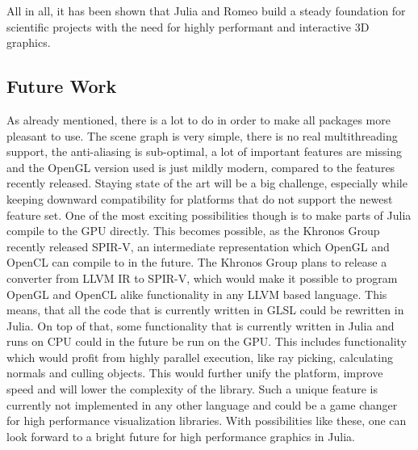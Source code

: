 All in all, it has been shown that Julia and Romeo build a steady foundation for scientific projects with the need for highly performant and interactive 3D graphics.

\subsection{Future Work}

As already mentioned, there is a lot to do in order to make all packages more pleasant to use.
The scene graph is very simple, there is no real multithreading support, the anti-aliasing is sub-optimal, a lot of important features are missing and the OpenGL version used is just mildly modern, compared to the features recently released. 
Staying state of the art will be a big challenge, especially while keeping downward compatibility for platforms that do not support the newest feature set.
One of the most exciting possibilities though is to make parts of Julia compile to the GPU directly. 
This becomes possible, as the Khronos Group recently released \ac{SPIR-V}, an intermediate representation which \ac{OpenGL} and \ac{OpenCL} can compile to in the future. The Khronos Group plans to release a converter from \ac{LLVM} \ac{IR} to \ac{SPIR-V}, which would make it possible to program \ac{OpenGL} and \ac{OpenCL} alike functionality in any \ac{LLVM} based language\cite{SpirV}.
This means, that all the code that is currently written in \ac{GLSL} could be rewritten in Julia. 
On top of that, some functionality that is currently written in Julia and runs on \ac{CPU} could in the future be run on the \ac{GPU}. This includes functionality which would profit from highly parallel execution, like ray picking, calculating normals and culling objects.
This would further unify the platform, improve speed and will lower the complexity of the library. 
Such a unique feature is currently not implemented in any other language and could be a game changer for high performance visualization libraries.
With possibilities like these, one can look forward to a bright future for high performance graphics in Julia.
